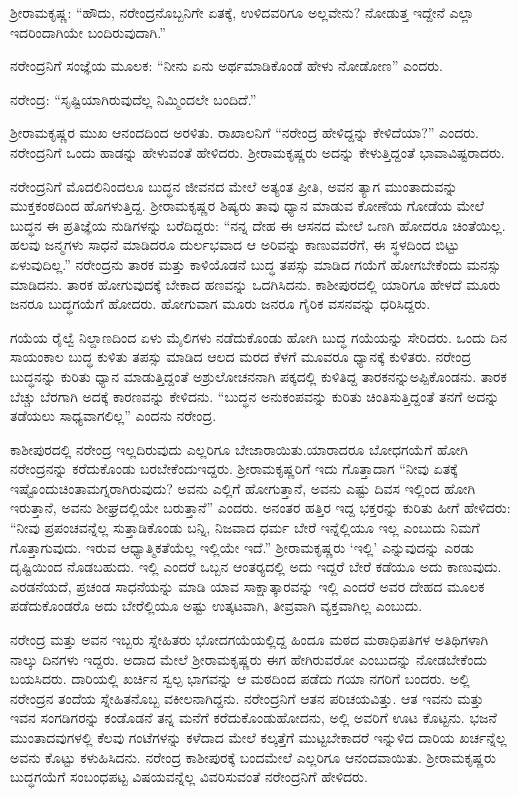 ಶ‍್ರೀರಾಮಕೃಷ್ಣ: “ಹೌದು, ನರೇಂದ್ರನೊಬ್ಬನಿಗೇ ಏತಕ್ಕೆ, ಉಳಿದವರಿಗೂ ಅಲ್ಲವೇನು? ನೋಡುತ್ತ ಇದ್ದೇನೆ ಎಲ್ಲಾ ಇದರಿಂದಾಗಿಯೇ ಬಂದಿರುವುದಾಗಿ.”

ನರೇಂದ್ರನಿಗೆ ಸಂಜ್ಞೆಯ ಮೂಲಕ: “ನೀನು ಏನು ಅರ್ಥಮಾಡಿಕೊಂಡೆ ಹೇಳು ನೋಡೋಣ” ಎಂದರು.

ನರೇಂದ್ರ: “ಸೃಷ್ಟಿಯಾಗಿರುವುದೆಲ್ಲ ನಿಮ್ಮಿಂದಲೇ ಬಂದಿದೆ.”

ಶ‍್ರೀರಾಮಕೃಷ್ಣರ ಮುಖ ಆನಂದದಿಂದ ಅರಳಿತು. ರಾಖಾಲನಿಗೆ “ನರೇಂದ್ರ ಹೇಳಿದ್ದನ್ನು ಕೇಳಿದೆಯಾ?” ಎಂದರು. ನರೇಂದ್ರನಿಗೆ ಒಂದು ಹಾಡನ್ನು ಹೇಳುವಂತೆ ಹೇಳಿದರು. ಶ‍್ರೀರಾಮಕೃಷ್ಣರು ಅದನ್ನು ಕೇಳುತ್ತಿದ್ದಂತೆ ಭಾವಾವಿಷ್ಟರಾದರು.

ನರೇಂದ್ರನಿಗೆ ಮೊದಲಿನಿಂದಲೂ ಬುದ್ಧನ ಜೀವನದ ಮೇಲೆ ಅತ್ಯಂತ ಪ್ರೀತಿ, ಅವನ ತ್ಯಾಗ ಮುಂತಾದುವನ್ನು ಮುಕ್ತಕಂಠದಿಂದ ಹೊಗಳುತ್ತಿದ್ದ. ಶ‍್ರೀರಾಮಕೃಷ್ಣರ ಶಿಷ್ಯರು ತಾವು ಧ್ಯಾನ ಮಾಡುವ ಕೋಣೆಯ ಗೋಡೆಯ ಮೇಲೆ ಬುದ್ಧನ ಈ ಪ್ರತಿಜ್ಞೆಯ ನುಡಿಗಳನ್ನು ಬರೆದಿದ್ದರು: “ನನ್ನ ದೇಹ ಈ ಆಸನದ ಮೇಲೆ ಒಣಗಿ ಹೋದರೂ ಚಿಂತೆಯಿಲ್ಲ. ಹಲವು ಜನ್ಮಗಳು ಸಾಧನೆ ಮಾಡಿದರೂ ದುರ್ಲಭವಾದ ಆ ಅರಿವನ್ನು ಕಾಣುವವರೆಗೆ, ಈ ಸ್ಥಳದಿಂದ ಬಿಟ್ಟು ಏಳುವುದಿಲ್ಲ.” ನರೇಂದ್ರನು ತಾರಕ ಮತ್ತು ಕಾಳಿಯೊಡನೆ ಬುದ್ಧ ತಪಸ್ಸು ಮಾಡಿದ ಗಯೆಗೆ ಹೋಗಬೇಕೆಂದು ಮನಸ್ಸು ಮಾಡಿದನು. ತಾರಕ ಹೋಗುವುದಕ್ಕೆ ಬೇಕಾದ ಹಣವನ್ನು ಒದಗಿಸಿದನು. ಕಾಶೀಪುರದಲ್ಲಿ ಯಾರಿಗೂ ಹೇಳದೆ ಮೂರು ಜನರೂ ಬುದ್ಧಗಯೆಗೆ ಹೋದರು. ಹೋಗುವಾಗ ಮೂರು ಜನರೂ ಗೈರಿಕ ವಸನವನ್ನು ಧರಿಸಿದ್ದರು.

ಗಯೆಯ ರೈಲ್ವೆ ನಿಲ್ದಾಣದಿಂದ ಏಳು ಮೈಲಿಗಳು ನಡೆದುಕೊಂಡು ಹೋಗಿ ಬುದ್ಧ ಗಯೆಯನ್ನು ಸೇರಿದರು. ಒಂದು ದಿನ ಸಾಯಂಕಾಲ ಬುದ್ಧ ಕುಳಿತು ತಪಸ್ಸು ಮಾಡಿದ ಆಲದ ಮರದ ಕೆಳಗೆ ಮೂವರೂ ಧ್ಯಾನಕ್ಕೆ ಕುಳಿತರು. ನರೇಂದ್ರ ಬುದ್ಧನನ್ನು ಕುರಿತು ಧ್ಯಾನ ಮಾಡುತ್ತಿದ್ದಂತೆ ಅಶ್ರುಲೋಚನನಾಗಿ ಪಕ್ಕದಲ್ಲಿ ಕುಳಿತಿದ್ದ ತಾರಕನನ್ನು\break ಅಪ್ಪಿಕೊಂಡನು. ತಾರಕ ಬೆಚ್ಚು ಬೆರಗಾಗಿ ಅದಕ್ಕೆ ಕಾರಣವನ್ನು ಕೇಳಿದನು. “ಬುದ್ಧನ ಅನುಕಂಪವನ್ನು ಕುರಿತು ಚಿಂತಿಸುತ್ತಿದ್ದಂತೆ ತನಗೆ ಅದನ್ನು ತಡೆಯಲು ಸಾಧ್ಯವಾಗಲಿಲ್ಲ” ಎಂದನು ನರೇಂದ್ರ.

ಕಾಶೀಪುರದಲ್ಲಿ ನರೇಂದ್ರ ಇಲ್ಲದಿರುವುದು ಎಲ್ಲರಿಗೂ ಬೇಜಾರಾಯಿತು.\break ಯಾರಾದರೂ ಬೋಧಗಯೆಗೆ ಹೋಗಿ ನರೇಂದ್ರನನ್ನು ಕರೆದುಕೊಂಡು ಬರಬೇಕೆಂದು\break ಇದ್ದರು. ಶ‍್ರೀರಾಮಕೃಷ್ಣರಿಗೆ ಇದು ಗೊತ್ತಾದಾಗ “ನೀವು ಏತಕ್ಕೆ ಇಷ್ಟೊಂದು\break ಚಿಂತಾಮಗ್ನರಾಗಿರುವುದು? ಅವನು ಎಲ್ಲಿಗೆ ಹೋಗುತ್ತಾನೆ, ಅವನು ಎಷ್ಟು ದಿವಸ ಇಲ್ಲಿಂದ ಹೋಗಿ ಇರುತ್ತಾನೆ, ಅವನು ಶೀಘ್ರದಲ್ಲಿಯೇ ಬರುತ್ತಾನೆ” ಎಂದರು. ಅನಂತರ ಹತ್ತಿರ ಇದ್ದ ಭಕ್ತರನ್ನು ಕುರಿತು ಹೀಗೆ ಹೇಳಿದರು: “ನೀವು ಪ್ರಪಂಚವನ್ನೆಲ್ಲ ಸುತ್ತಾಡಿಕೊಂಡು ಬನ್ನಿ, ನಿಜವಾದ ಧರ್ಮ ಬೇರೆ ಇನ್ನೆಲ್ಲಿಯೂ ಇಲ್ಲ ಎಂಬುದು ನಿಮಗೆ ಗೊತ್ತಾಗುವುದು. ಇರುವ ಆಧ್ಯಾತ್ಮಿಕತೆಯೆಲ್ಲ ಇಲ್ಲಿಯೇ ಇದೆ.” ಶ‍್ರೀರಾಮಕೃಷ್ಣರು ‘ಇಲ್ಲಿ’ ಎನ್ನುವುದನ್ನು ಎರಡು ದೃಷ್ಟಿಯಿಂದ ನೊಡಬಹುದು. ಇಲ್ಲಿ ಎಂದರೆ ಒಬ್ಬನ ಆಂತರ‍್ಯದಲ್ಲಿ ಅದು ಇದ್ದರೆ ಬೇರೆ ಕಡೆಯೂ ಅದು ಕಾಣುವುದು. ಎರಡನೆಯದೆ, ಪ್ರಚಂಡ ಸಾಧನೆಯನ್ನು ಮಾಡಿ ಯಾವ ಸಾಕ್ಷಾತ್ಕಾರವನ್ನು ಇಲ್ಲಿ ಎಂದರೆ ಅವರ ದೇಹದ ಮೂಲಕ ಪಡೆದುಕೊಂಡರೊ ಅದು ಬೇರೆಲ್ಲಿಯೂ ಅಷ್ಟು ಉತ್ಕಟವಾಗಿ, ತೀವ್ರವಾಗಿ ವ್ಯಕ್ತವಾಗಿಲ್ಲ ಎಂಬುದು.

ನರೇಂದ್ರ ಮತ್ತು ಅವನ ಇಬ್ಬರು ಸ್ನೇಹಿತರು ಭೋದಗಯೆಯಲ್ಲಿದ್ದ ಹಿಂದೂ ಮಠದ ಮಠಾಧಿಪತಿಗಳ ಅತಿಥಿಗಳಾಗಿ ನಾಲ್ಕು ದಿನಗಳು ಇದ್ದರು. ಅದಾದ ಮೇಲೆ ಶ‍್ರೀರಾಮಕೃಷ್ಣರು ಈಗ ಹೇಗಿರುವರೋ ಎಂಬುದನ್ನು ನೋಡಬೇಕೆಂದು ಬಯಸಿದರು. ದಾರಿಯಲ್ಲಿ ಖರ್ಚಿನ ಸ್ವಲ್ಪ ಭಾಗವನ್ನು ಆ ಮಠದಿಂದ ಪಡೆದು ಗಯಾ ನಗರಿಗೆ ಬಂದರು. ಅಲ್ಲಿ ನರೇಂದ್ರನ ತಂದೆಯ ಸ್ನೇಹಿತನೊಬ್ಬ ವಕೀಲನಾಗಿದ್ದನು. ನರೇಂದ್ರನಿಗೆ ಆತನ ಪರಿಚಯವಿತ್ತು. ಆತ ಇವನು ಮತ್ತು ಇವನ ಸಂಗಡಿಗರನ್ನು ಕಂಡೊಡನೆ ತನ್ನ ಮನೆಗೆ ಕರೆದುಕೊಂಡುಹೋದನು, ಅಲ್ಲಿ ಅವರಿಗೆ ಊಟ ಕೊಟ್ಟನು. ಭಜನೆ ಮುಂತಾದವುಗಳಲ್ಲಿ ಕೆಲವು ಗಂಟೆಗಳನ್ನು ಕಳೆದಾದ ಮೇಲೆ ಕಲ್ಕತ್ತೆಗೆ ಮುಟ್ಟಬೇಕಾದರೆ ಇನ್ನುಳಿದ ದಾರಿಯ ಖರ್ಚನ್ನೆಲ್ಲ ಅವನು ಕೊಟ್ಟು ಕಳುಹಿಸಿದನು. ನರೇಂದ್ರ ಕಾಶೀಪುರಕ್ಕೆ ಬಂದಮೇಲೆ ಎಲ್ಲರಿಗೂ ಆನಂದವಾಯಿತು. ಶ‍್ರೀರಾಮಕೃಷ್ಣರು ಬುದ್ಧಗಯೆಗೆ ಸಂಬಂಧಪಟ್ಟ ವಿಷಯವನ್ನೆಲ್ಲ ವಿವರಿಸುವಂತೆ ನರೇಂದ್ರನಿಗೆ ಹೇಳಿದರು.

